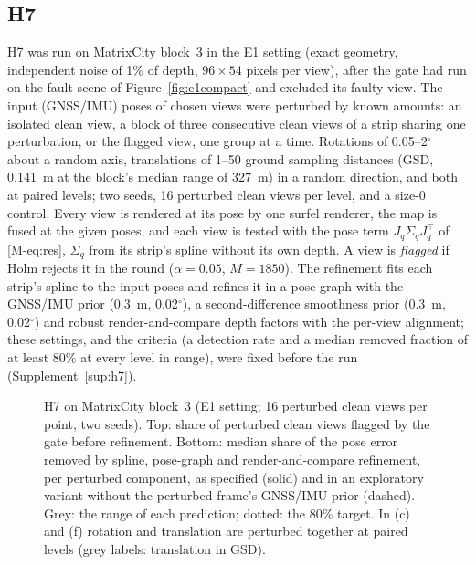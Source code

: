 \subsection{H7}
\label{sup:h7full}
H7 was run on MatrixCity block~3 in the E1 setting (exact geometry, independent noise of 1\% of depth,
$96\times54$ pixels per view), after the gate had run on the fault scene of Figure~\ref{fig:e1compact} and
excluded its faulty view. The input (GNSS/IMU) poses of chosen views were perturbed by known amounts: an
isolated clean view, a block of three consecutive clean views of a strip sharing one perturbation, or the
flagged view, one group at a time. Rotations of 0.05--2$^{\circ}$ about a random axis, translations of 1--50
ground sampling distances (GSD, 0.141~m at the block's median range of 327~m) in a random direction, and
both at paired levels; two seeds, 16 perturbed clean views per level, and a size-0 control. Every view is
rendered at its pose by one surfel renderer, the map is fused at the given poses, and each view is tested
with the pose term $J_q\Sigma_qJ_q^{\top}$ of \eqref{M-eq:res}, $\Sigma_q$ from its strip's spline without its own
depth. A view is \emph{flagged} if Holm rejects it in the round ($\alpha=0.05$, $M=1850$). The refinement fits
each strip's spline to the input poses and refines it in a pose graph with the GNSS/IMU prior
(0.3~m, 0.02$^{\circ}$), a second-difference smoothness prior (0.3~m, 0.02$^{\circ}$) and robust
render-and-compare depth factors with the per-view alignment; these settings, and the criteria (a detection
rate and a median removed fraction of at least 80\% at every level in range), were fixed before the run
(Supplement~\ref{sup:h7}).

\begin{figure}[!t]
\centering

\caption{H7 on MatrixCity block~3 (E1 setting; 16 perturbed clean views per point, two seeds). Top: share of
perturbed clean views flagged by the gate before refinement. Bottom: median share of the pose error
removed by spline, pose-graph and render-and-compare refinement, per perturbed component, as specified
(solid) and in an exploratory variant without the perturbed frame's GNSS/IMU prior (dashed). Grey: the
range of each prediction; dotted: the 80\% target. In (c) and (f) rotation and translation are perturbed
together at paired levels (grey labels: translation in GSD).}
\label{fig:h7}
\end{figure}


